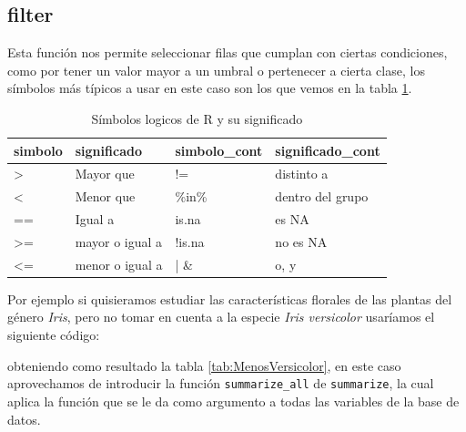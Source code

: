 \documentclass[]{book}
\newenvironment{Shaded}{\begin{snugshade}}{\end{snugshade}}
\newcommand{\KeywordTok}[1]{\textcolor[rgb]{0.13,0.29,0.53}{\textbf{#1}}}
\newcommand{\NormalTok}[1]{#1}
\newcommand{\OperatorTok}[1]{\textcolor[rgb]{0.81,0.36,0.00}{\textbf{#1}}}
\newcommand{\StringTok}[1]{\textcolor[rgb]{0.31,0.60,0.02}{#1}}
\begin{document}
\hypertarget{filter}{%
\subsection{filter}\label{filter}}

Esta función nos permite seleccionar filas que cumplan con ciertas
condiciones, como por tener un valor mayor a un umbral o pertenecer a
cierta clase, los símbolos más típicos a usar en este caso son los que
vemos en la tabla \ref{tab:Logicas}.

\begin{table}

\caption{\label{tab:Logicas}Símbolos logicos de R y su significado}
\centering
\begin{tabular}[t]{llll}
\toprule
simbolo & significado & simbolo\_cont & significado\_cont\\
\midrule
> & Mayor que & != & distinto a\\
< & Menor que & \%in\% & dentro del grupo\\
== & Igual a & is.na & es NA\\
>= & mayor o igual a & !is.na & no es NA\\
<= & menor o igual a & | \& & o, y\\
\bottomrule
\end{tabular}
\end{table}

Por ejemplo si quisieramos estudiar las características florales de las
plantas del género \emph{Iris}, pero no tomar en cuenta a la especie
\emph{Iris versicolor} usaríamos el siguiente código:

\begin{Shaded}
\end{Shaded}

obteniendo como resultado la tabla \ref{tab:MenosVersicolor}, en este
caso aprovechamos de introducir la función \texttt{summarize\_all} de
\texttt{summarize}, la cual aplica la función que se le da como
argumento a todas las variables de la base de datos.
\end{document}
